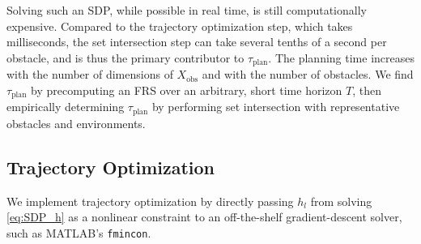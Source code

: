 
Solving such an SDP, while possible in real time, is still computationally expensive.
Compared to the trajectory optimization step, which takes milliseconds, the set intersection step can take several tenths of a second per obstacle, and is thus the primary contributor to $\tau_\text{plan}$.
The planning time increases with the number of dimensions of $X_\text{obs}$ and with the number of obstacles.
We find $\tau_\text{plan}$ by precomputing an FRS over an arbitrary, short time horizon $T$, then empirically determining $\tau_\text{plan}$ by performing set intersection with representative obstacles and environments.

\subsection{Trajectory Optimization}\label{subsec:traj_opt_imp}
We implement trajectory optimization by directly passing $h_l$ from solving \eqref{eq:SDP_h} as a nonlinear constraint to an off-the-shelf gradient-descent solver, such as MATLAB's \texttt{fmincon}.




